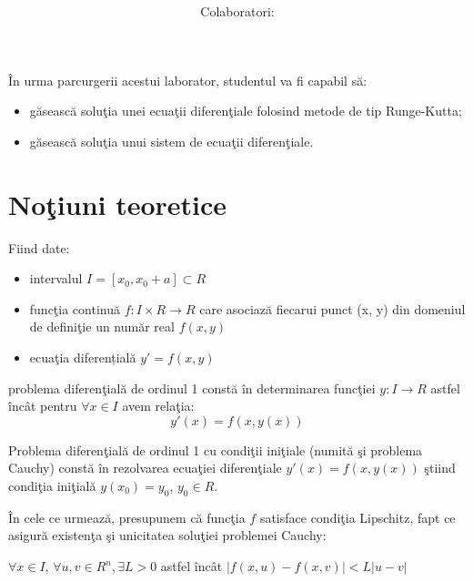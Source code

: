 \documentclass{exam}
\title{
	\textmd{\textbf{\MNLabTitle}}
	\author{Colaboratori: \MNAuthor}
}
\begin{document}
\begin{coverpages}

	\maketitle
	\tableofcontents

\end{coverpages}

În urma parcurgerii acestui laborator, studentul va fi capabil să:

\begin{itemize}
	\item găsească soluţia unei ecuaţii diferenţiale folosind metode de tip Runge-Kutta;
	\item găsească soluţia unui sistem de ecuaţii diferenţiale.
\end{itemize}
\section{Noţiuni teoretice}

Fiind date:
\begin{itemize}
	\item intervalul $I = [ x_0, x_0 + a] \subset R$
	\item funcţia continuă $f:I\times R \rightarrow R$ care asociază fiecarui punct (x, y) din
	      domeniul de definiţie un număr real $f(x,y)$
	\item ecuaţia diferențială $y' = f(x,y)$
\end{itemize}

\noindent problema diferenţială de ordinul 1 constă în determinarea funcţiei $y:I \rightarrow R$ astfel încât pentru $\forall x\in I$ avem relaţia:
$$y'(x) = f(x,y(x))$$

Problema diferenţială de ordinul 1 cu condiţii iniţiale (numită şi problema Cauchy) constă în rezolvarea ecuaţiei diferenţiale $y'(x) = f(x,y(x))$ ştiind condiţia iniţială $y(x_0) = y_0$, $y_0 \in R$.

În cele ce urmează, presupunem că funcţia $f$ satisface condiţia Lipschitz, fapt ce asigură existenţa şi unicitatea soluţiei problemei Cauchy:
\begin{center}
	$\forall x \in I$, $\forall u, v \in R^n, \exists L>0$ astfel încât $\left|f(x,u)-f(x,v)\right|<L\left|u-v\right|$
\end{center}
\end{document}

